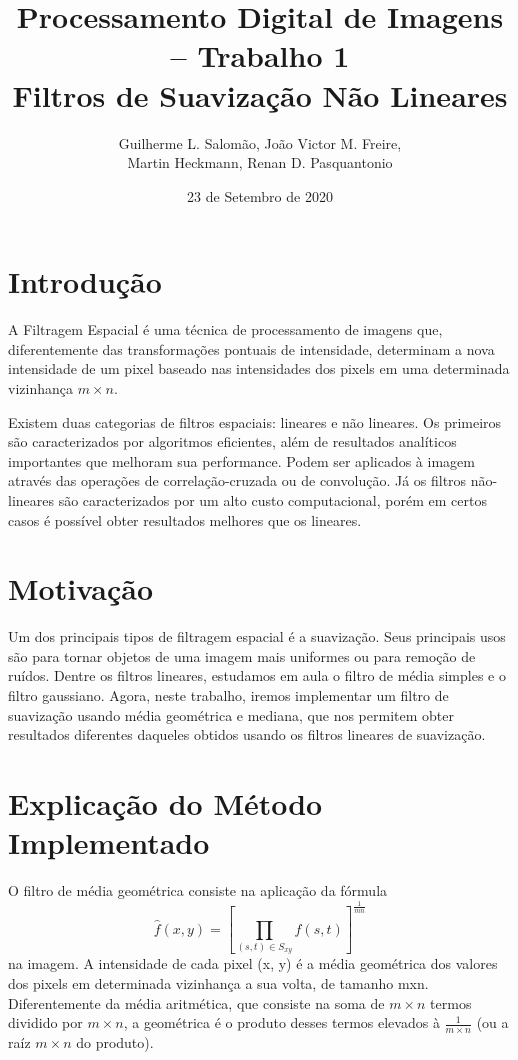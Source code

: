 \documentclass[12pt,a4paper]{article}
\title{Processamento Digital de Imagens – Trabalho 1\\Filtros de Suavização Não Lineares}
\author{Guilherme L. Salomão, João Victor M. Freire, \\Martin Heckmann, Renan D. Pasquantonio }
\date{23 de Setembro de 2020}
\begin{document}
\maketitle

\section{Introdução}

    A Filtragem Espacial é uma técnica de processamento de imagens que, diferentemente das transformações pontuais de intensidade, determinam a nova intensidade de um pixel baseado nas intensidades dos pixels em uma determinada vizinhança $m \times n$.
    
    Existem duas categorias de filtros espaciais: lineares e não lineares. Os primeiros são caracterizados por algoritmos eficientes, além de resultados analíticos importantes que melhoram sua performance. Podem ser aplicados à imagem através das operações de correlação-cruzada ou de convolução. Já os filtros não-lineares são caracterizados por um alto custo computacional, porém em certos casos é possível obter resultados melhores que os lineares.

\section{Motivação}
Um dos principais tipos de filtragem espacial é a suavização. Seus principais usos são para tornar objetos de uma imagem mais uniformes ou para remoção de ruídos. Dentre os filtros lineares, estudamos em aula o filtro de média simples e o filtro gaussiano. Agora, neste trabalho, iremos implementar um filtro de suavização usando média geométrica e mediana, que nos permitem obter resultados diferentes daqueles obtidos usando os filtros lineares de suavização.

\section{Explicação do Método Implementado}
O filtro de média geométrica consiste na aplicação da fórmula $$\hat{f}(x, y) = [\prod _{(s,t) \in S_{xy}} f(s,t)]^{\frac{1}{mn}} $$ na imagem. A intensidade de cada pixel (x, y) é a média geométrica dos valores dos pixels em determinada vizinhança a sua volta, de tamanho mxn. Diferentemente da média aritmética, que consiste na soma de $m \times n$ termos dividido por $m \times n$, a geométrica é o produto desses termos elevados à $\frac{1}{m \times n}$ (ou a raíz $m \times n$ do produto). 
\end{document}
